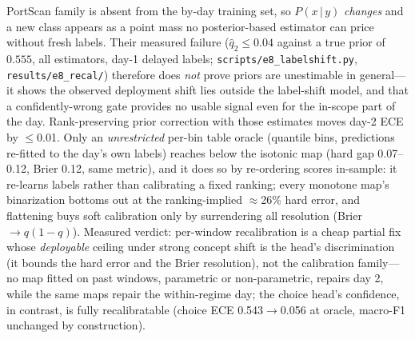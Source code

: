 \documentclass[sigconf,anonymous=false]{acmart}
\begin{document}
PortScan family is absent from the by-day training set, so $P(x\,|\,y)$ \emph{changes} and a new class appears as a point mass no posterior-based estimator can price without fresh labels. Their measured failure ($\widehat{q}_2 \le 0.04$ against a true prior of $0.555$, all estimators, day-1 delayed labels; \texttt{scripts/e8\_labelshift.py}, \texttt{results/e8\_recal/}) therefore does \emph{not} prove priors are unestimable in general---it shows the observed deployment shift lies outside the label-shift model, and that a confidently-wrong gate provides no usable signal even for the in-scope part of the day. Rank-preserving prior correction with those estimates moves day-2 ECE by $\le$0.01. Only an \emph{unrestricted} per-bin table oracle (quantile bins, predictions re-fitted to the day's own labels) reaches below the isotonic map (hard gap 0.07--0.12, Brier 0.12, same metric), and it does so by re-ordering scores in-sample: it re-learns labels rather than calibrating a fixed ranking; every monotone map's binarization bottoms out at the ranking-implied $\approx$26\% hard error, and flattening buys soft calibration only by surrendering all resolution (Brier $\to q(1{-}q)$). Measured verdict: per-window recalibration is a cheap partial fix whose \emph{deployable} ceiling under strong concept shift is the head's discrimination (it bounds the hard error and the Brier resolution), not the calibration family---no map fitted on past windows, parametric or non-parametric, repairs day 2, while the same maps repair the within-regime day; the choice head's confidence, in contrast, is fully recalibratable (choice ECE 0.543$\to$0.056 at oracle, macro-F1 unchanged by construction).
\end{document}
